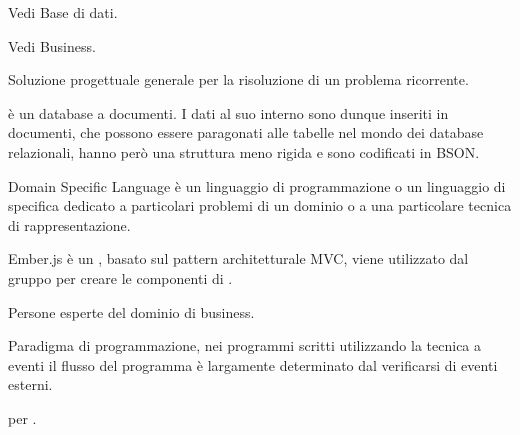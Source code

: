 \begin{itemize}


Vedi Base di dati.


Vedi Business.


Soluzione progettuale generale per la risoluzione di un problema ricorrente.


 è un database a documenti. I dati al suo interno sono dunque inseriti in documenti, che possono essere paragonati alle tabelle nel mondo dei database relazionali, hanno però una struttura meno rigida e sono codificati in BSON.


Domain Specific Language è un linguaggio di programmazione o un linguaggio di specifica dedicato a particolari problemi di un dominio o a una particolare tecnica di rappresentazione.
\end{itemize}


\begin{itemize}


Ember.js è un   , basato sul pattern architetturale MVC, viene utilizzato dal gruppo per creare le componenti  di \ProjectName{}.


Persone esperte del dominio di business.


Paradigma di programmazione, nei programmi scritti utilizzando la tecnica a eventi il flusso del programma è largamente determinato dal verificarsi di eventi esterni. 


 per .

\end{itemize}


